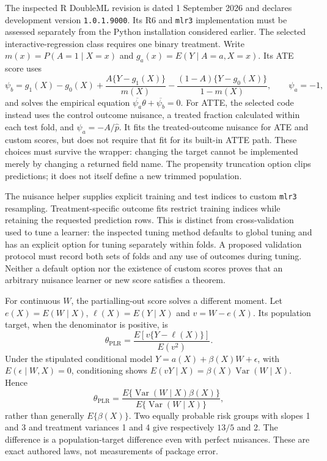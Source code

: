The inspected R DoubleML revision is dated 1 September 2026 and declares
development version \texttt{1.0.1.9000}. Its R6 and \texttt{mlr3} implementation
must be assessed separately from the Python installation considered earlier.
The selected interactive-regression class requires one binary treatment. Write
$m(x)=P(A=1\mid X=x)$ and $g_a(x)=E(Y\mid A=a,X=x)$. Its ATE score uses
\begin{equation}
 \psi_b=g_1(X)-g_0(X)+\frac{A\{Y-g_1(X)\}}{m(X)}
 -\frac{(1-A)\{Y-g_0(X)\}}{1-m(X)},\qquad \psi_a=-1,
 \label{exec20:rfx-irm}
\end{equation}
and solves the empirical equation $\overline{\psi_a}\theta+
\overline{\psi_b}=0$. For ATTE, the selected code instead uses the control
outcome nuisance, a treated fraction calculated within each test fold, and
$\psi_a=-A/\widehat p$. It fits the treated-outcome nuisance for ATE and custom
scores, but does not require that fit for its built-in ATTE path. These choices
must survive the wrapper: changing the target cannot be implemented merely by
changing a returned field name. The propensity truncation option clips predictions;
it does not itself define a new trimmed population.
\citep{exec20_rfx_doubleml_r,dml2018}

The nuisance helper supplies explicit training and test indices to custom
\texttt{mlr3} resampling. Treatment-specific outcome fits restrict training
indices while retaining the requested prediction rows. This is distinct from
cross-validation used to tune a learner: the inspected tuning method defaults
to global tuning and has an explicit option for tuning separately within folds.
A proposed validation protocol must record both sets of folds and any use of
outcomes during tuning. Neither a default option nor the existence of custom
scores proves that an arbitrary nuisance learner or new score satisfies a theorem.
\citep{exec20_rfx_doubleml_r,dml2018}

For continuous $W$, the partialling-out score solves a different moment. Let
$e(X)=E(W\mid X)$, $\ell(X)=E(Y\mid X)$ and $v=W-e(X)$. Its population target,
when the denominator is positive, is
\begin{equation}
 \theta_{\mathrm{PLR}}=
 \frac{E[v\{Y-\ell(X)\}]}{E(v^2)}.
 \label{exec20:rfx-plr}
\end{equation}
Under the stipulated conditional model
$Y=a(X)+\beta(X)W+\epsilon$, with $E(\epsilon\mid W,X)=0$, conditioning shows
$E(vY\mid X)=\beta(X)\operatorname{Var}(W\mid X)$. Hence
\begin{equation}
 \theta_{\mathrm{PLR}}=
 \frac{E\{\operatorname{Var}(W\mid X)\beta(X)\}}
 {E\{\operatorname{Var}(W\mid X)\}},
 \label{exec20:rfx-weighted}
\end{equation}
rather than generally $E\{\beta(X)\}$. Two equally probable risk groups with
slopes 1 and 3 and treatment variances 1 and 4 give respectively $13/5$ and 2.
The difference is a population-target difference even with perfect nuisances.
These are exact authored laws, not measurements of package error.
\citep{exec20_rfx_doubleml_r,exec20_rfx_reference}

